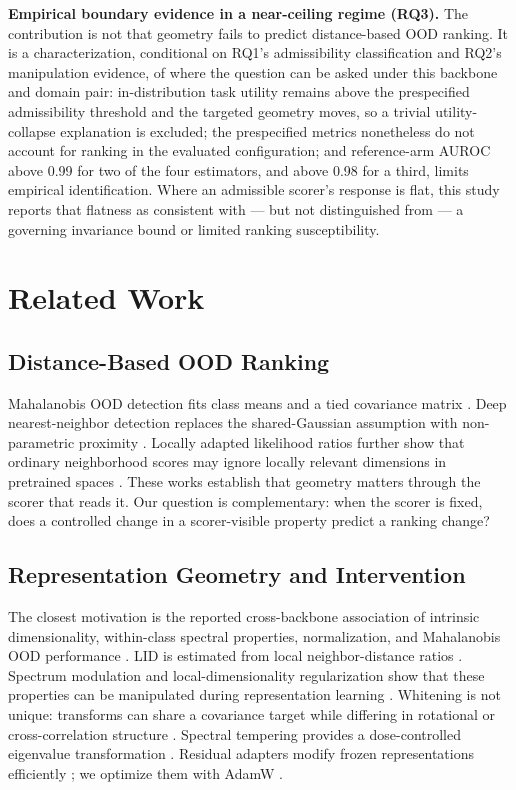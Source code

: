 \documentclass[11pt,a4paper]{article}
\begin{document}
\textbf{Empirical boundary evidence in a near-ceiling regime (RQ3).} The contribution is not that geometry fails to predict distance-based OOD ranking. It is a characterization, conditional on RQ1's admissibility classification and RQ2's manipulation evidence, of where the question can be asked under this backbone and domain pair: in-distribution task utility remains above the prespecified admissibility threshold and the targeted geometry moves, so a trivial utility-collapse explanation is excluded; the prespecified metrics nonetheless do not account for ranking in the evaluated configuration; and reference-arm AUROC above 0.99 for two of the four estimators, and above 0.98 for a third, limits empirical identification. Where an admissible scorer's response is flat, this study reports that flatness as consistent with --- but not distinguished from --- a governing invariance bound or limited ranking susceptibility.

\section{Related Work}
\subsection{Distance-Based OOD Ranking}
Mahalanobis OOD detection fits class means and a tied covariance matrix \cite{b1}. Deep nearest-neighbor detection replaces the shared-Gaussian assumption with non-parametric proximity \cite{b2}. Locally adapted likelihood ratios further show that ordinary neighborhood scores may ignore locally relevant dimensions in pretrained spaces \cite{b3}. These works establish that geometry matters through the scorer that reads it. Our question is complementary: when the scorer is fixed, does a controlled change in a scorer-visible property predict a ranking change?

\subsection{Representation Geometry and Intervention}
The closest motivation is the reported cross-backbone association of intrinsic dimensionality, within-class spectral properties, normalization, and Mahalanobis OOD performance \cite{b4}. LID is estimated from local neighbor-distance ratios \cite{b5}. Spectrum modulation and local-dimensionality regularization show that these properties can be manipulated during representation learning \cite{b6,b7}. Whitening is not unique: transforms can share a covariance target while differing in rotational or cross-correlation structure \cite{b8}. Spectral tempering provides a dose-controlled eigenvalue transformation \cite{b9}. Residual adapters modify frozen representations efficiently \cite{b10}; we optimize them with AdamW \cite{b11}.
\end{document}
